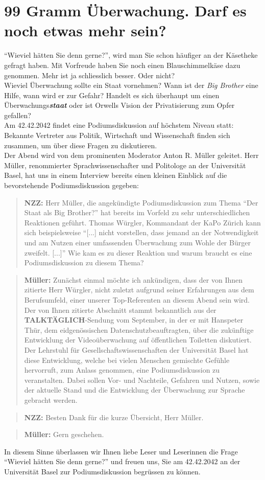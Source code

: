 \documentclass{scrartcl}
\begin{document}
\section*{99 Gramm Überwachung. Darf es noch etwas mehr sein?}
"`Wieviel hätten Sie denn gerne?"', wird man Sie schon
häufiger an der Käsetheke gefragt haben. Mit Vorfreude haben
Sie noch einen Blauschimmelkäse dazu genommen. Mehr ist ja
schliesslich besser. Oder nicht?\\
Wieviel Überwachung sollte ein Staat vornehmen? Wann ist
der \textit{Big Brother} eine Hilfe, wann wird er zur Gefahr?
Handelt es sich überhaupt um einen Überwachungs\textbf{\textit{staat}}
oder ist Orwells Vision der Privatisierung zum Opfer gefallen?\\
Am 42.42.2042 findet eine Podiumsdiskussion auf höchstem Niveau statt:
Bekannte Vertreter aus Politik, Wirtschaft
und Wissenschaft finden sich zusammen, um über diese Fragen zu diskutieren.\\ 
Der Abend wird von dem prominenten Moderator Anton R. Müller
geleitet. Herr Müller, renommierter Sprachwissenschafter und Politologe
an der Universität Basel, hat uns in
einem Interview bereits einen kleinen Einblick auf die
bevorstehende Podiumsdiskussion gegeben:

\begin{quote}
\textbf{NZZ:} Herr Müller, die angekündigte Podiumsdiskussion zum Thema
"`Der Staat als Big Brother?"' hat bereits im Vorfeld zu
sehr unterschiedlichen Reaktionen geführt. Thomas Würgler, 
Kommandant der KaPo Zürich kann sich beispielsweise "`[...] nicht
 vorstellen, dass jemand an der Notwendigkeit und am Nutzen
 einer umfassenden Überwachung zum Wohle der Bürger zweifelt. [...]"'
Wie kam es zu dieser Reaktion und warum braucht es eine  
Podiumsdiskussion zu diesem Thema?
\end{quote}
\begin{quote}
\textbf{Müller:} Zunächst einmal möchte ich ankündigen, dass
der von Ihnen zitierte Herr Würgler, nicht zuletzt aufgrund
seiner Erfahrungen aus dem Berufsumfeld, einer unserer Top-Refe\-renten
an diesem Abend sein wird. Der von Ihnen zitierte Abschnitt stammt
bekanntlich aus der \textbf{TALKTÄGLICH}-Sendung vom September,
in der er mit Hanspeter Thür,
dem eidgenössischen Datenschutzbeauftragten, über die zukünftige
Entwicklung der Videoüberwachung auf öffentlichen Toiletten
diskutiert.
Der Lehrstuhl für Gesellschaftswissenschaften der Universität Basel
hat diese Entwicklung, welche bei vielen Menschen gemischte Gefühle
hervorruft, zum Anlass genommen, eine Podiumsdiskussion zu veranstalten.
Dabei sollen Vor- und Nachteile, Gefahren und Nutzen, sowie der aktuelle
 Stand und die Entwicklung der Überwachung zur Sprache gebracht werden.
\end{quote}
\begin{quote}
\textbf{NZZ:} Besten Dank für die kurze Übersicht,
Herr Müller.
\end{quote}
\begin{quote}
\textbf{Müller:} Gern geschehen.
\end{quote}
In diesem Sinne überlassen wir Ihnen liebe Leser und Leserinnen
die Frage "`Wieviel hätten Sie denn gerne?"' und freuen uns, Sie am
42.42.2042 an der Universität Basel zur Podiumsdiskussion
begrüssen zu können.
\end{document}
